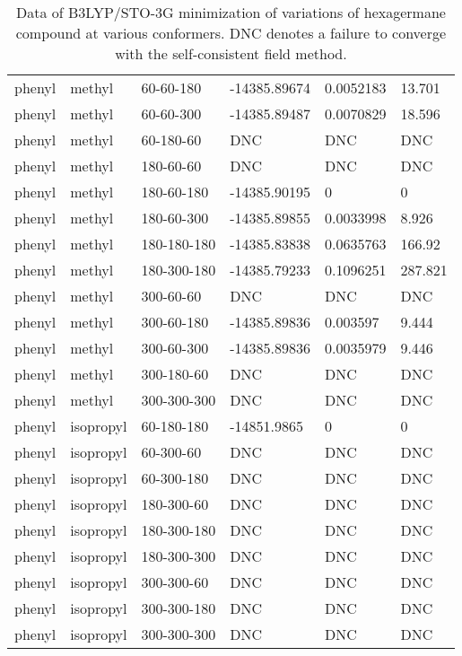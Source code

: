 \begin{table}[]
\begin{tabular}{llllll}
		phenyl & methyl & 60-60-180 & -14385.89674 & 0.0052183 & 13.701 \\
		phenyl & methyl & 60-60-300 & -14385.89487 & 0.0070829 & 18.596 \\
		phenyl & methyl & 60-180-60 & DNC & DNC & DNC \\
		phenyl & methyl & 180-60-60 & DNC & DNC & DNC \\
		phenyl & methyl & 180-60-180 & -14385.90195 & 0 & 0 \\
		phenyl & methyl & 180-60-300 & -14385.89855 & 0.0033998 & 8.926 \\
		phenyl & methyl & 180-180-180 & -14385.83838 & 0.0635763 & 166.92 \\
		phenyl & methyl & 180-300-180 & -14385.79233 & 0.1096251 & 287.821 \\
		phenyl & methyl & 300-60-60 & DNC & DNC & DNC \\
		phenyl & methyl & 300-60-180 & -14385.89836 & 0.003597 & 9.444 \\
		phenyl & methyl & 300-60-300 & -14385.89836 & 0.0035979 & 9.446 \\
		phenyl & methyl & 300-180-60 & DNC & DNC & DNC \\
		phenyl & methyl & 300-300-300 & DNC & DNC & DNC \\ \hline
		phenyl & isopropyl & 60-180-180 & -14851.9865 & 0 & 0 \\
		phenyl & isopropyl & 60-300-60 & DNC & DNC & DNC \\
		phenyl & isopropyl & 60-300-180 & DNC & DNC & DNC \\
		phenyl & isopropyl & 180-300-60 & DNC & DNC & DNC \\
		phenyl & isopropyl & 180-300-180 & DNC & DNC & DNC \\
		phenyl & isopropyl & 180-300-300 & DNC & DNC & DNC \\
		phenyl & isopropyl & 300-300-60 & DNC & DNC & DNC \\
		phenyl & isopropyl & 300-300-180 & DNC & DNC & DNC \\
		phenyl & isopropyl & 300-300-300 & DNC & DNC & DNC
	\end{tabular}
	\caption{Data of B3LYP/STO-3G minimization of variations of hexagermane compound at various conformers. DNC denotes a failure to converge with the self-consistent field method.}
	\label{tab:Ge6Ver2Data}
\end{table}


